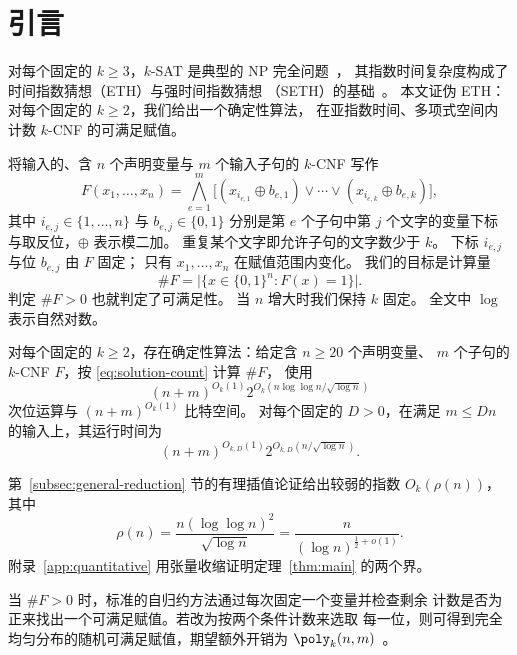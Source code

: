 \section{引言}
对每个固定的 $k\ge3$，$k$-SAT 是典型的 NP 完全问题~\cite{Cook71}，
其指数时间复杂度构成了时间指数猜想（ETH）与强时间指数猜想
（SETH）的基础~\cite{IP01,IPZ}。
本文证伪 ETH：对每个固定的 $k\ge2$，我们给出一个确定性算法，
在亚指数时间、多项式空间内计数 $k$-CNF 的可满足赋值。

将输入的、含 $n$ 个声明变量与 $m$ 个输入子句的 $k$-CNF 写作
\[
 F(x_1,\ldots,x_n)=\bigwedge_{e=1}^m
 \bigl[(x_{i_{e,1}}\oplus b_{e,1})\vee\cdots\vee
       (x_{i_{e,k}}\oplus b_{e,k})\bigr],
\]
其中 $i_{e,j}\in\{1,\ldots,n\}$ 与 $b_{e,j}\in\{0,1\}$ 分别是第
$e$ 个子句中第 $j$ 个文字的变量下标与取反位，$\oplus$ 表示模二加。
重复某个文字即允许子句的文字数少于 $k$。
下标 $i_{e,j}$ 与位 $b_{e,j}$ 由 $F$ 固定；
只有 $x_1,\ldots,x_n$ 在赋值范围内变化。
我们的目标是计算量
\begin{equation}\label{eq:solution-count}
 \#F=\bigl|\{x\in\{0,1\}^n:F(x)=1\}\bigr|.
\end{equation}
判定 $\#F>0$ 也就判定了可满足性。
当 $n$ 增大时我们保持 $k$ 固定。
全文中 $\log$ 表示自然对数。
\begin{theorem}\label{thm:main}
对每个固定的 $k\ge2$，存在确定性算法：给定含 $n\ge20$ 个声明变量、
$m$ 个子句的 $k$-CNF $F$，按 \eqref{eq:solution-count} 计算 $\#F$，
使用
\[
 (n+m)^{O_k(1)}2^{O_k(n\log\log n/\sqrt{\log n})}
\]
次位运算与 $(n+m)^{O_k(1)}$ 比特空间。
对每个固定的 $D>0$，在满足 $m\le Dn$ 的输入上，其运行时间为
\[
 (n+m)^{O_{k,D}(1)}2^{O_{k,D}(n/\sqrt{\log n})}.
\]
\end{theorem}

第~\ref{subsec:general-reduction} 节的有理插值论证给出较弱的指数
$O_k(\rho(n))$，其中
\[
 \rho(n)=\frac{n(\log\log n)^2}{\sqrt{\log n}}
          =\frac{n}{(\log n)^{\frac12+o(1)}}.
\]
附录~\ref{app:quantitative} 用张量收缩证明定理~\ref{thm:main}
的两个界。

当 $\#F>0$ 时，标准的自归约方法通过每次固定一个变量并检查剩余
计数是否为正来找出一个可满足赋值。若改为按两个条件计数来选取
每一位，则可得到完全均匀分布的随机可满足赋值，期望额外开销为
$\poly_k(n,m)$~\cite[Theorem~3.3(1)]{JVV86}。

